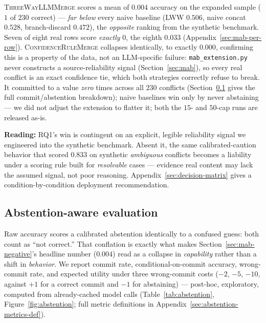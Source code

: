 \documentclass[11pt]{article}
\begin{document}
\textsc{ThreeWayLLMMerge} scores a mean of $0.004$ accuracy on the expanded
sample ($1$ of $230$ correct) --- \emph{far below} every naive baseline (LWW
$0.506$, naive concat $0.528$, branch-discard $0.472$), the \emph{opposite}
ranking from the synthetic benchmark. Seven of eight real rows score
\emph{exactly} $0$, the eighth $0.033$ (Appendix~\ref{sec:mab-per-row}).
\textsc{ConfidenceRuleMerge} collapses identically, to exactly $0.000$,
confirming this is a property of the data, not an LLM-specific failure:
\texttt{mab\_extension.py} never constructs a source-reliability signal
(Section~\ref{sec:mab}), so every real conflict is an exact confidence tie,
which both strategies correctly refuse to break. It committed to a value
\emph{zero} times across all $230$ conflicts (Section~\ref{sec:abstention}
gives the full commit/abstention breakdown); naive baselines win only by
never abstaining --- we did not adjust the extension to flatter it; both
the $15$- and $50$-cap runs are released as-is.

\textbf{Reading:} RQ1's win is contingent on an explicit, legible reliability
signal we engineered into the synthetic benchmark. Absent it, the same
calibrated-caution behavior that scored $0.833$ on synthetic
\emph{ambiguous} conflicts becomes a liability under a scoring rule built
for \emph{resolvable} cases --- evidence real content may lack the assumed
signal, not poor reasoning. Appendix~\ref{sec:decision-matrix} gives a
condition-by-condition deployment recommendation.


\subsection{Abstention-aware evaluation}
\label{sec:abstention}

Raw accuracy scores a calibrated abstention identically to a confused guess:
both count as ``not correct.'' That conflation is exactly what makes
Section~\ref{sec:mab-negative}'s headline number ($0.004$) read as a
collapse in \emph{capability} rather than a shift in \emph{behavior}. We
report commit rate, conditional-on-commit accuracy, wrong-commit rate, and
expected utility under three wrong-commit costs ($-2$, $-5$, $-10$, against
$+1$ for a correct commit and $-1$ for abstaining) --- post-hoc, exploratory,
computed from already-cached model calls (Table~\ref{tab:abstention},
Figure~\ref{fig:abstention}; full metric definitions in
Appendix~\ref{sec:abstention-metrics-def}).
\end{document}
